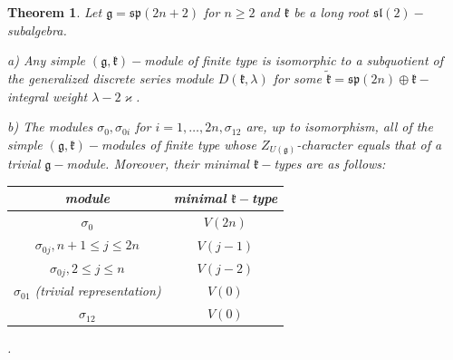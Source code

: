 \documentclass[default]{./styles/svmult}
\newtheorem{theo}{Theorem}[section]
\renewcommand{\gg}{\mathfrak{g}}
\newcommand{\hh}{\mathfrak{h}}
\newcommand{\kk}{\mathfrak{k}}
\newcommand{\mm}{\mathfrak{m}}
\renewcommand{\sp}{\mathfrak{sp}}
\renewcommand{\tt}{\mathfrak{t}}
\renewcommand{\sl}{\mathfrak{sl}}
\begin{document}
\begin{theo}\label{th:6}
 Let $\gg = \sp(2n+2)$ for $n \geq 2$ and $\kk$ be a long root $\sl(2)-$subalgebra.
 
 a) Any simple $(\gg,\kk)-$module of finite type is isomorphic to a subquotient of the generalized discrete series module $D(\kk,\lambda)$ for some $\tilde{\kk} = \sp (2n)\oplus\kk-$integral weight $\lambda - 2\varkappa$.
 
 b) The modules $\sigma_0, \sigma_{0i}$ for $i = 1, \dots,2n,\sigma_{12}$ are, up to isomorphism, all of the simple $(\gg,\kk)-$modules of finite type whose $Z_{U(\gg)}$-character equals that of a trivial $\gg-$module. Moreover, their minimal $\kk-$types are as follows:
 \begin{center}
\begin{tabular}{|c|c|}\hline
\textbf{module} & \textbf{minimal $\kk-$type}\\\hline
$\sigma_0$ & $V(2n)$\\\hline
$\sigma_{0j}, n+1 \leq j \leq 2n$ & $V(j-1)$\\\hline
$\sigma_{0j}, 2 \leq j \leq n$ & $V(j-2)$\\\hline
$\sigma_{01}$ (trivial representation) & $V(0)$\\\hline
$\sigma_{12}$ & $V(0)$\\\hline
\end{tabular}\hspace{0.2cm}.
\end{center}
\end{theo}

\end{document}
